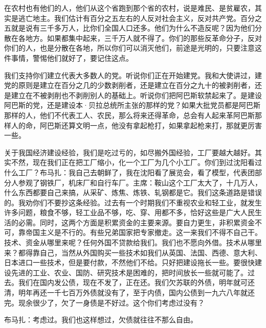 在农村也有他们的人，他们从这个省跑到那个省的农村，说是难民、是贫雇农，其实是逃亡地主。我们估计有百分之五左右的人反对社会主义，反对共产党。百分之五就是说有三千多万人，比你们全国人口还多。他们为什么不造反呢？因为他们分散在各地方。如果都集中起来，三千万人就不得了。你们的那些反革命分子，反对你们的人，也是分散在各地，所以你们可以消灭他们，前途是光明的，只要注意这件事情，警惕他们就好了，要记住这点。

我们支持你们建立代表大多数人的党。听说你们正在开始建党。我和大使讲过，建党的原则是建立在百分之几的少数剥削者，还是建立在百分之九十的被剥削者，还是建立在不被剥削也不剥削别人的基础上。听说你们把阿巴斯软禁起来了。是建设阿巴斯的党，还是建设本·贝拉总统所主张的那样的党？如果大批党员都是阿巴斯那样的人，他们不代表工人、农民，那么将来还得革命，总会有人起来革阿巴斯那样人的命，阿巴斯还算文明一点，他没有拿起枪打，如果拿起枪来打，那就更厉害一些。

关于我国经济建设经验，我们是吃过亏的，如尽搬外国经验，工厂要越大越好。其实不然，现在我们正在把工厂缩小，化一个工厂为几个小工厂。你们到过沈阳看过什么工厂？布马扎：我自己去朝鲜了，我在沈阳看了展览会，看了模型，代表团部分人参观了钢铁厂，机床厂和自行车厂。主席：鞍山这个工厂太大了，十几万人，什么东西都要自己来搞，从采矿、炼焦、炼铁、轧钢都是它。我们这条道路是错误的。我劝你们不要抄这条经验。过去有一个时期我们不重视农业和轻工业，就发生许多问题，粮食不够，轻工业品不够，吃、穿、用都不多，恰好这些是广大人民生活的必需。同时，这两个方面是积累资金的主要来源。要自力更生，非积累资金不可，靠帝国主义是不行的。有些兄弟国家把专家撤走。这一来我们不得不自己干。技术、资金从哪里来呢？任何外国不贷款给我们。我们也不愿向外借。技术从哪里来？都得靠自己，当然从外国购买一些技术如我们从英国、法国、西德、意大利、日本进口一些技术，但是要付款，不然他们不给。只好把建设拖长一些。要很快建设先进的工业、农业、国防、研究技术是困难的，把时间放长一些就可能了。过去。我们在国内发公债，现在不发了，正在还。我们欠苏联的外债，明年就可还清，明年再还一千七百万外债就没有了，至于内债，国内公债到一九六八年就还完。现余很少了，欠了一身债是不好过。这个你们考虑过没有？

布马扎：考虑过。我们也这样想过，欠债就往往不那么自由。

